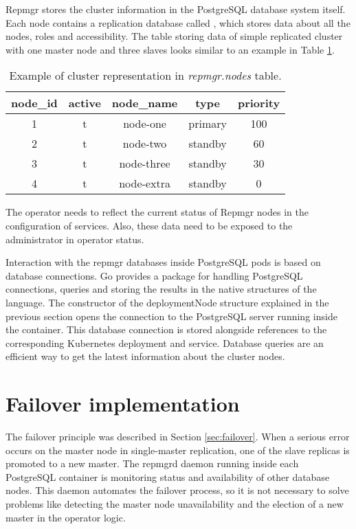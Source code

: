\documentclass[
  digital, %
  twoside, %
  table,   %
  lof,     %
  lot,     %
]{fithesis3}
\begin{document}
Repmgr stores the cluster information in the PostgreSQL database system itself. Each node contains a replication database called , which stores data about all the nodes, roles and accessibility. The table storing data of simple replicated cluster with one master node and three slaves looks similar to an example in Table \ref{table:repmgr_nodes}.

\begin{table}[ht!]
\centering
\begin{tabular}{|c c c c c|}
 \hline
 node\_id & active & node\_name & type & priority \\ [0.5ex]
 \hline
 1 & t & node-one & primary & 100 \\

 2 & t & node-two & standby & 60 \\

 3 & t & node-three & standby & 30 \\

 4 & t & node-extra & standby & 0 \\ [1ex]
 \hline
\end{tabular}
\caption{Example of cluster representation in \textit{repmgr.nodes} table.}
\label{table:repmgr_nodes}
\end{table}

The operator needs to reflect the current status of Repmgr nodes in the configuration of services. Also, these data need to be exposed to the administrator in operator status.

Interaction with the repmgr databases inside PostgreSQL pods is based on database connections. Go provides a package for handling PostgreSQL connections, queries and storing the results in the native structures of the language. The constructor of the deploymentNode structure explained in the previous section opens the connection to the PostgreSQL server running inside the container. This database connection is stored alongside references to the corresponding Kubernetes deployment and service. Database queries are an efficient way to get the latest information about the cluster nodes.

\section{Failover implementation}
The failover principle was described in Section \ref{sec:failover}. When a serious error occurs on the master node in single-master replication, one of the slave replicas is promoted to a new master. The repmgrd daemon running inside each PostgreSQL container is monitoring status and availability of other database nodes. This daemon automates the failover process, so it is not necessary to solve problems like detecting the master node unavailability and the election of a new master in the operator logic.
\end{document}
